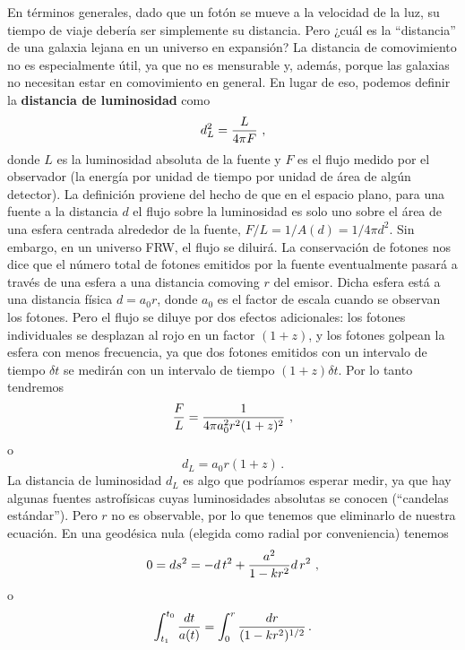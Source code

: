 \documentclass[11pt,b5paper,openany,twoside]{book}
\begin{document}
En términos generales, dado que un fotón se mueve a la velocidad de la luz, su tiempo de viaje debería ser simplemente su distancia.
Pero ¿cuál es la ``distancia'' de una galaxia lejana en un universo en expansión?
La distancia de comovimiento no es especialmente útil, ya que no es mensurable y, además, porque las galaxias no necesitan estar en comovimiento en general.
En lugar de eso, podemos definir la {\bf distancia de luminosidad} como
\begin{equation}
d^2_L = {{L}\over{4\pi F}}\ ,\label{8.68}
\end{equation}
donde $L$ es la luminosidad absoluta de la fuente y $F$ es el flujo medido por el observador (la energía por unidad de tiempo por unidad de área de algún detector).
La definición proviene del hecho de que en el espacio plano, para una fuente a la distancia $d$ el flujo sobre la luminosidad es solo uno sobre el área de una esfera centrada alrededor de la fuente, $F/L=1/A(d)=1/4\pi d^2$.
Sin embargo, en un universo FRW, el flujo se diluirá.
La conservación de fotones nos dice que el número total de fotones emitidos por la fuente eventualmente pasará a través de una esfera a una distancia comoving $r$ del emisor.
Dicha esfera está a una distancia física $d=a_0r$, donde $a_0$ es el factor de escala cuando se observan los fotones.
Pero el flujo se diluye por dos efectos adicionales: los fotones individuales se desplazan al rojo en un factor $(1+z)$, y los fotones golpean la esfera con menos frecuencia, ya que dos fotones emitidos con un intervalo de tiempo $\delta t$ se medirán con un intervalo de tiempo $(1+z)\delta t$.
Por lo tanto tendremos
\begin{equation}
{F\over L} = {1\over{4\pi a_0^2 r^2 (1+z)^2}}\ ,\label{8.69}
\end{equation}
o
\begin{equation}
d_L = a_0 r (1+z)\,.\label{8.70}
\end{equation}
La distancia de luminosidad $d_L$ es algo que podríamos esperar medir, ya que hay algunas fuentes astrofísicas cuyas luminosidades absolutas se conocen (``candelas estándar'').
Pero $r$ no es observable, por lo que tenemos que eliminarlo de nuestra ecuación.
En una geodésica nula (elegida como radial por conveniencia) tenemos
\begin{equation}
0 =ds^2 = - d\,t^2 + {{a^2}\over {1-kr^2}} d\,r^2\ ,\label{8.71}
\end{equation}
o
\begin{equation}
\int_{t_1}^{t_0} {{dt}\over{a(t)}}
= \int_{0}^{r} {{dr}\over{(1-kr^2)^{1/2}}}\,.
\label{8.72}
\end{equation}
\end{document}
